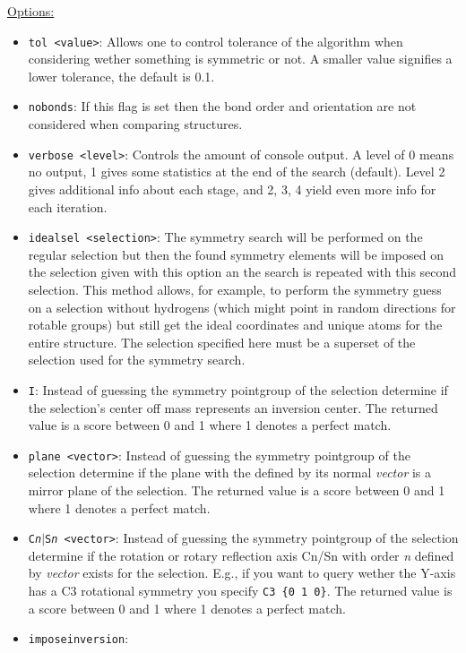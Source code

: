 \begin{itemize}
  \underline{Options:}
  \begin{itemize}
  \item {\tt tol <value>}:
    Allows one to control tolerance of the algorithm when
    considering wether something is symmetric or not.
    A smaller value signifies a lower tolerance, the default
    is 0.1.
  \item {\tt nobonds}:
    If this flag is set then the bond order and orientation
    are not considered when comparing structures.
  \item {\tt verbose <level>}:
    Controls the amount of console output.
    A level of 0 means no output, 1 gives some statistics at
    the end of the search (default). Level 2 gives additional
    info about each stage, and 2, 3, 4 yield even more info
    for each iteration.
  \item {\tt idealsel <selection>}:
    The symmetry search will be performed on the regular
    selection but then the found symmetry elements will be
    imposed on the selection given with this option an the
    search is repeated with this second selection. This method
    allows, for example, to perform the symmetry guess on a
    selection without hydrogens (which might point in random
    directions for rotable groups) but still get the ideal
    coordinates and unique atoms for the entire structure.
    The selection specified here must be a superset of the
    selection used for the symmetry search.
  \item {\tt I}:
    Instead of guessing the symmetry pointgroup of the selection
    determine if the selection's center off mass represents an
    inversion center. The returned value is a score between 0
    and 1 where 1 denotes a perfect match.
  \item {\tt plane <vector>}:
    Instead of guessing the symmetry pointgroup of the selection
    determine if the plane with the defined by its normal
    {\it vector} is a mirror plane of the selection. The
    returned value is a score between 0 and 1 where 1 denotes
    a perfect match.
  \item {\tt C{\it n}$\mid$S{\it n} <vector>}:
    Instead of guessing the symmetry pointgroup of the selection
    determine if the rotation or rotary reflection axis Cn/Sn
    with order {\it n} defined by {\it vector} exists for the
    selection. E.g., if you want to query wether the Y-axis
    has a C3 rotational symmetry you specify {\tt C3 \{0 1 0\}}.
    The returned value is a score between 0 and 1 where 1
    denotes a perfect match.
  \item {\tt imposeinversion}:

\end{itemize}
\end{itemize}
